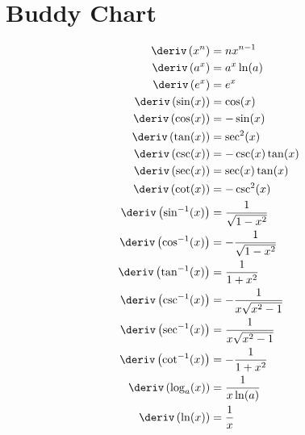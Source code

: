 
\chapter{Buddy Chart}
\begin{align*}
  \deriv\left(x^n\right) &= nx^{n-1}\\
  \deriv\left(a^x\right) &= a^x\ln(a) \\
  \deriv\left(e^x\right) &= e^x \\
  \deriv\left(\sin(x)\right) &= \cos(x) \\
  \deriv\left(\cos(x)\right) &= -\sin(x) \\
  \deriv\left(\tan(x)\right) &= \sec^2(x) \\
  \deriv\left(\csc(x)\right) &= -\csc(x)\tan(x) \\
  \deriv\left(\sec(x)\right) &= \sec(x)\tan(x) \\
  \deriv\left(\cot(x)\right) &= -\csc^2(x) \\
  \deriv\left(\sin^{-1}(x)\right) &= \dfrac{1}{\sqrt{1 - x^2}} \\
  \deriv\left(\cos^{-1}(x)\right) &= -\dfrac{1}{\sqrt{1 - x^2}} \\
  \deriv\left(\tan^{-1}(x)\right) &= \dfrac{1}{1 + x^2} \\
  \deriv\left(\csc^{-1}(x)\right) &= -\dfrac{1}{x\sqrt{x^2-1}} \\
  \deriv\left(\sec^{-1}(x)\right) &= \dfrac{1}{x\sqrt{x^2-1}} \\
  \deriv\left(\cot^{-1}(x)\right) &= -\dfrac{1}{1 + x^2} \\
  \deriv\left(\log_a(x)\right) &= \dfrac{1}{x\ln(a)} \\
  \deriv\left(\ln(x)\right) &= \dfrac{1}{x}
\end{align*}
